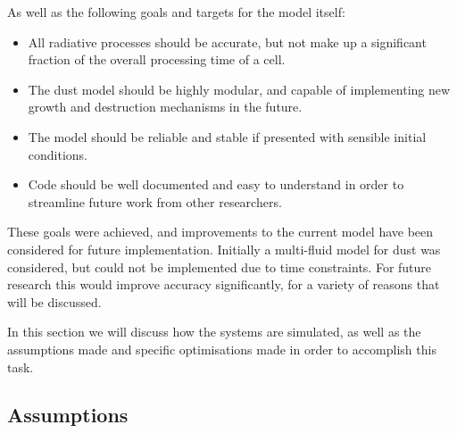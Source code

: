 \noindent
As well as the following goals and targets for the model itself:

\begin{itemize}
  \item All radiative processes should be accurate, but not make up a significant fraction of the overall processing time of a cell.
  \item The dust model should be highly modular, and capable of implementing new growth and destruction mechanisms in the future.
  \item The model should be reliable and stable if presented with sensible initial conditions.
  \item Code should be well documented and easy to understand in order to streamline future work from other researchers.
\end{itemize}

\noindent
These goals were achieved, and improvements to the current model have been considered for future implementation.
Initially a multi-fluid model for dust was considered, but could not be implemented due to time constraints.
For future research this would improve accuracy significantly, for a variety of reasons that will be discussed.

In this section we will discuss how the systems are simulated, as well as the assumptions made and specific optimisations made in order to accomplish this task.

\subsection{Assumptions}
\label{sec:simassumptions}

